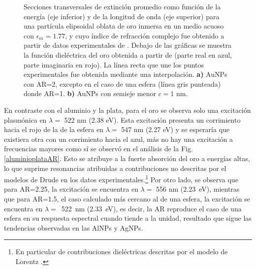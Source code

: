 \begin{figure}[H]
	\quad%
	\caption{Secciones transversales de extinción promedio como función de la energía (eje inferior) y de la longitud de onda (eje superior) para una partícula elipsoidal oblata de oro inmersa en un medio acuoso con $\epsilon_m=1.77$, y cuyo índice de refracción complejo fue obtenido a partir de datos experimentales de \cite{Plata}. Debajo de las gráficas se muestra la función dieléctrica del oro obtenida a partir de \cite{Plata} (parte real en azul, parte imaginaria en rojo). La línea recta que une los puntos experimentales fue obtenida mediante una interpolación. \textbf{a)} AuNPs con AR=2, excepto en el caso de una esfera (línea gris punteada) donde AR=1. \textbf{b)} AuNPs con semieje menor $c=1$ nm.}\label{oro}
\end{figure}

En contraste con el aluminio y la plata, para el oro se observa solo una excitación plasmónica en $\lambda=$ 522 nm (2.38 eV). Esta excitación presenta un corrimiento hacia el rojo de la de la esfera en $\lambda=$ 547 nm (2.27 eV) y se esperaría que existiera otra con un corrimiento hacia el azul, más no hay una excitación a frecuencias mayores como sí se observó en el análisis de la Fig. \ref{aluminioplataAR}. Esto se atribuye a la fuerte absorción del oro a energías altas, lo que suprime resonancias atribuidas a contribuciones no descritas por el modelos de Drude en los datos experimentales.\footnote{En particular de contribuciones dieléctricas descritas por el modelo de Lorentz \cite{Plasmonics}.} Por otro lado, se observa que para AR=2.25, la excitación se encuentra en $\lambda=$ 556 nm (2.23~eV), mientras que para AR=1.5, el caso calculado más cercano al de una esfera, la excitación se encuentra en $\lambda=$~522~nm (2.33~eV), es decir, la AR reproduce el caso de una esfera en su respuesta espectral cuando tiende a la unidad, resultado que sigue las tendencias observadas en las AlNPs y AgNPs.\\

